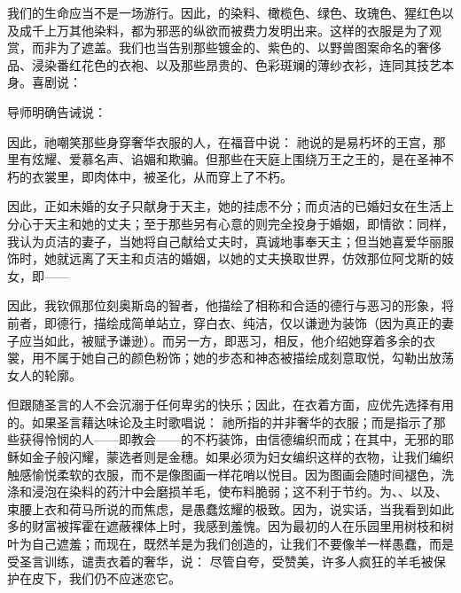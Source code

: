 \par

我们的生命应当不是一场游行。因此，的染料、橄榄色、绿色、玫瑰色、猩红色以及成千上万其他染料，都为邪恶的纵欲而被费力发明出来。这样的衣服是为了观赏，而非为了遮盖。我们也当告别那些镀金的、紫色的、以野兽图案命名的奢侈品、浸染番红花色的衣袍、以及那些昂贵的、色彩斑斓的薄纱衣衫，连同其技艺本身。喜剧说： \par

导师明确告诫说： \par

因此，祂嘲笑那些身穿奢华衣服的人，在福音中说： 祂说的是易朽坏的王宫，那里有炫耀、爱慕名声、谄媚和欺骗。但那些在天庭上围绕万王之王的，是在圣神不朽的衣裳里，即肉体中，被圣化，从而穿上了不朽。\par

因此，正如未婚的女子只献身于天主，她的挂虑不分；而贞洁的已婚妇女在生活上分心于天主和她的丈夫；至于那些另有心意的则完全投身于婚姻，即情欲：同样，我认为贞洁的妻子，当她将自己献给丈夫时，真诚地事奉天主；但当她喜爱华丽服饰时，她就远离了天主和贞洁的婚姻，以她的丈夫换取世界，仿效那位阿戈斯的妓女，即——\par

\par

因此，我钦佩那位刻奥斯岛的智者，他描绘了相称和合适的德行与恶习的形象，将前者，即德行，描绘成简单站立，穿白衣、纯洁，仅以谦逊为装饰（因为真正的妻子应当如此，被赋予谦逊）。而另一方，即恶习，相反，他介绍她穿着多余的衣裳，用不属于她自己的颜色粉饰；她的步态和神态被描绘成刻意取悦，勾勒出放荡女人的轮廓。\par

但跟随圣言的人不会沉溺于任何卑劣的快乐；因此，在衣着方面，应优先选择有用的。如果圣言藉达味论及主时歌唱说： 祂所指的并非奢华的衣服；而是指示了那些获得怜悯的人——即教会——的不朽装饰，由信德编织而成；在其中，无邪的耶稣如金子般闪耀，蒙选者则是金穗。如果必须为妇女编织这样的衣物，让我们编织触感愉悦柔软的衣服，而不是像图画一样花哨以悦目。因为图画会随时间褪色，洗涤和浸泡在染料的药汁中会磨损羊毛，使布料脆弱；这不利于节约。为、、以及、束腰上衣和荷马所说的而焦虑，是愚蠢炫耀的极致。因为，说实话，当我看到如此多的财富被挥霍在遮蔽裸体上时，我感到羞愧。因为最初的人在乐园里用树枝和树叶为自己遮羞；而现在，既然羊是为我们创造的，让我们不要像羊一样愚蠢，而是受圣言训练，谴责衣着的奢华，说： 尽管自夸，受赞美，许多人疯狂的羊毛被保护在皮下，我们仍不应迷恋它。\par

